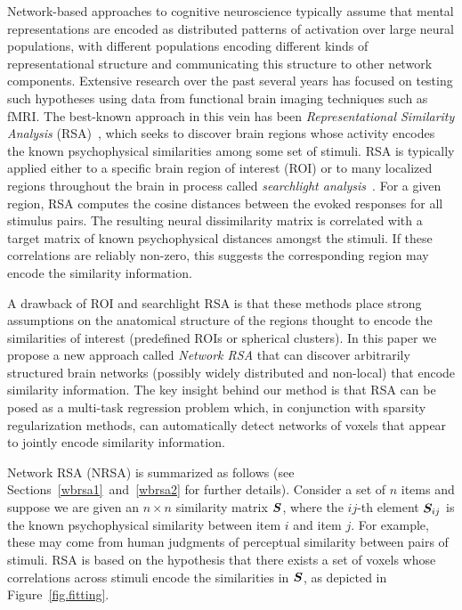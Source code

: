Network-based approaches to cognitive neuroscience typically assume that mental
representations are encoded as distributed patterns of activation over large neural
populations, with different populations encoding different kinds of representational
structure and communicating this structure to other network components. Extensive research
over the past several years has focused on testing such hypotheses using data from
functional brain imaging techniques such as fMRI. The best-known approach in this vein has
been \emph{Representational Similarity Analysis} (RSA)~\cite{RSA}, which seeks to discover
brain regions whose activity encodes the known psychophysical similarities among some set
of stimuli. RSA is typically applied either to a specific brain region of interest (ROI)
or to many localized regions throughout the brain in process called  {\em searchlight
  analysis}~\cite{searchlight}.  For a given region, RSA computes the cosine distances
between the evoked responses for all stimulus pairs. The resulting neural dissimilarity
matrix is correlated with a target matrix of known psychophysical distances amongst the
stimuli. If these correlations are reliably non-zero, this suggests the corresponding
region may encode the similarity information.

A drawback of ROI and searchlight RSA is that these methods place strong assumptions on
the anatomical structure of the regions thought to encode the similarities of interest
(predefined ROIs or spherical clusters). In this paper we propose a new approach called
{\em Network RSA} that can discover arbitrarily structured brain networks (possibly widely
distributed and non-local) that encode similarity information. The key insight behind our
method is that RSA can be posed as a multi-task regression problem which, in conjunction
with sparsity regularization methods, can automatically detect networks of voxels that
appear to jointly encode similarity information.

Network RSA (NRSA) is summarized as follows (see Sections~\ref{wbrsa1}~and~\ref{wbrsa2}
for further details).  Consider a set of $n$ items and suppose we are given an $n \times
n$ similarity matrix $\boldsymbol{S}$, where the $ij$-th element $\boldsymbol{S}_{ij}$ is the known
psychophysical similarity \cite{similarity} between item $i$ and item $j$. For example,
these may come from human judgments of perceptual similarity between pairs of stimuli.
RSA is based on the hypothesis that there exists a set of voxels whose correlations across
stimuli encode the similarities in $\boldsymbol{S}$, as depicted in Figure~\ref{fig.fitting}.

